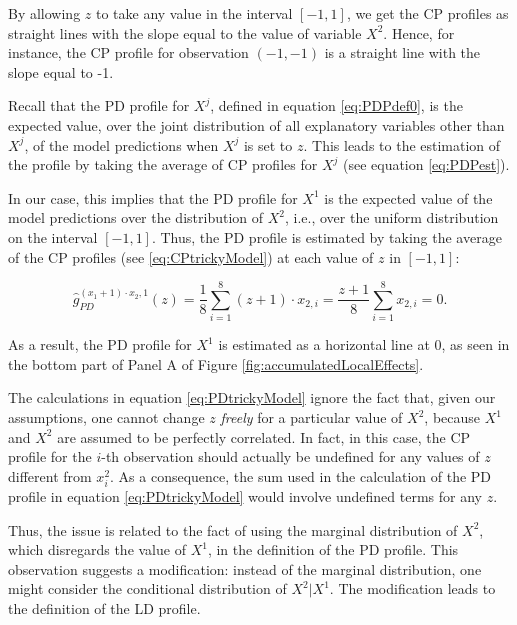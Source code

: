 \documentclass[]{krantz}
\begin{document}
By allowing \(z\) to take any value in the interval \([-1,1]\), we get the CP profiles as straight lines with the slope equal to the value of variable \(X^2\). Hence, for instance, the CP profile for observation \((-1,-1)\) is a straight line with the slope equal to -1.

Recall that the PD profile for \(X^j\), defined in equation \eqref{eq:PDPdef0}, is the expected value, over the joint distribution of all explanatory variables other than \(X^j\), of the model predictions when \(X^j\) is set to \(z\). This leads to the estimation of the profile by taking the average of CP profiles for \(X^j\) (see equation \eqref{eq:PDPest}).

In our case, this implies that the PD profile for \(X^1\) is the expected value of the model predictions over the distribution of \(X^2\), i.e., over the uniform distribution on the interval \([-1,1]\). Thus, the PD profile is estimated by taking the average of the CP profiles (see \eqref{eq:CPtrickyModel}) at each value of \(z\) in \([-1,1]\):

\begin{equation}
\hat g_{PD}^{(x_1 + 1)\cdot x_2, 1}(z) =  \frac{1}{8} \sum_{i=1}^{8} (z+1)\cdot x_{2,i} = \frac{z+1}{8}  \sum_{i=1}^{8} x_{2,i} = 0.
\label{eq:PDtrickyModel}
\end{equation}

As a result, the PD profile for \(X^1\) is estimated as a horizontal line at 0, as seen in the bottom part of Panel A of Figure \ref{fig:accumulatedLocalEffects}.

The calculations in equation \eqref{eq:PDtrickyModel} ignore the fact that, given our assumptions, one cannot change \(z\) \emph{freely} for a particular value of \(X^2\), because \(X^1\) and \(X^2\) are assumed to be perfectly correlated. In fact, in this case, the CP profile for the \(i\)-th observation should actually be undefined for any values of \(z\) different from \(x^2_i\). As a consequence, the sum used in the calculation of the PD profile in equation \eqref{eq:PDtrickyModel} would involve undefined terms for any \(z\).

Thus, the issue is related to the fact of using the marginal distribution of \(X^2\), which disregards the value of \(X^1\), in the definition of the PD profile. This observation suggests a modification: instead of the marginal distribution, one might consider the conditional distribution of \(X^2 | X^1\). The modification leads to the definition of the LD profile.
\end{document}
